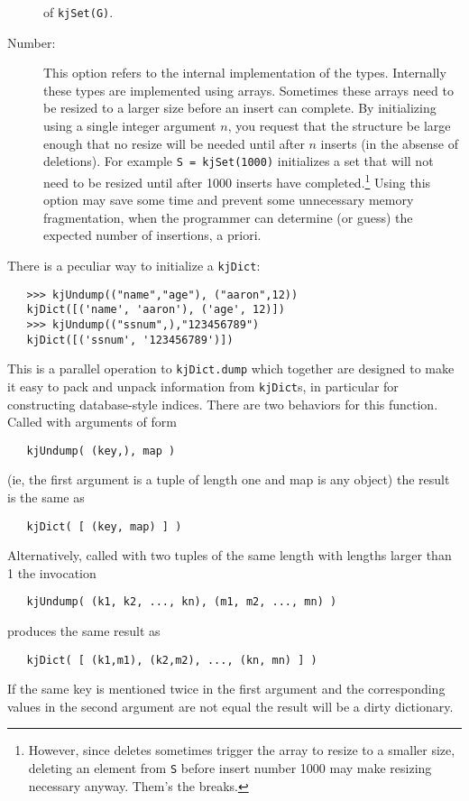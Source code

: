 \begin{description}
of {\tt kjSet(G)}.
\item[Number:]
This option refers to the internal implementation of the types.
Internally these types are implemented using arrays.  Sometimes
these arrays need to be resized to a larger size before an
insert can complete.
By initializing using a single integer argument $n$, you request
that the structure be large enough that no resize will be needed
until after $n$ inserts (in the absense of deletions).  
For example {\tt S = kjSet(1000)} initializes
a set that will not need to be resized until after 1000 inserts
have completed.\footnote{However, since deletes sometimes trigger
the array to resize to a smaller size, deleting an element from
{\tt S} before insert number 1000 may make resizing necessary anyway.
Them's the breaks.}  Using this option may save some time and
prevent some unnecessary memory fragmentation, when the programmer
can determine (or guess) the expected number of insertions, a priori.
\end{description}

There is a peculiar way to initialize a {\tt kjDict}:
\begin{verbatim}
   >>> kjUndump(("name","age"), ("aaron",12))
   kjDict([('name', 'aaron'), ('age', 12)])
   >>> kjUndump(("ssnum",),"123456789")
   kjDict([('ssnum', '123456789')])
\end{verbatim}
This is a parallel operation to {\tt kjDict.dump} which together
are designed to make it easy to pack and unpack information from
{\tt kjDict}s, in particular for constructing database-style
indices.  There are two behaviors for this function.
Called with arguments of form 
\begin{verbatim}
   kjUndump( (key,), map )
\end{verbatim}
(ie, the first argument is a tuple of length one and map is any object)
the result is the same as
\begin{verbatim}
   kjDict( [ (key, map) ] )
\end{verbatim}
Alternatively, called with two tuples of the same length with
lengths larger than 1 the invocation
\begin{verbatim}
   kjUndump( (k1, k2, ..., kn), (m1, m2, ..., mn) )
\end{verbatim}
produces the same result as
\begin{verbatim}
   kjDict( [ (k1,m1), (k2,m2), ..., (kn, mn) ] )
\end{verbatim}
If the same key is mentioned twice in the first argument
and the corresponding values in the second argument are
not equal the result will be a dirty dictionary.

